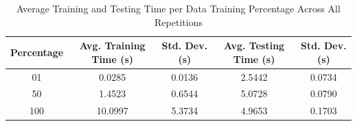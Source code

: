 \begin{table}[h]
\centering
\caption{Average Training and Testing Time per Data Training Percentage Across All Repetitions}
\begin{tabular}{c|cc|cc}
\toprule
Percentage & Avg. Training Time (s) & Std. Dev. (s) & Avg. Testing Time (s) & Std. Dev. (s) \\
\midrule
01 & 0.0285 & 0.0136 & 2.5442 & 0.0734 \\
50 & 1.4523 & 0.6544 & 5.0728 & 0.0790 \\
100 & 10.0997 & 5.3734 & 4.9653 & 0.1703 \\
\bottomrule
\end{tabular}
\end{table}
